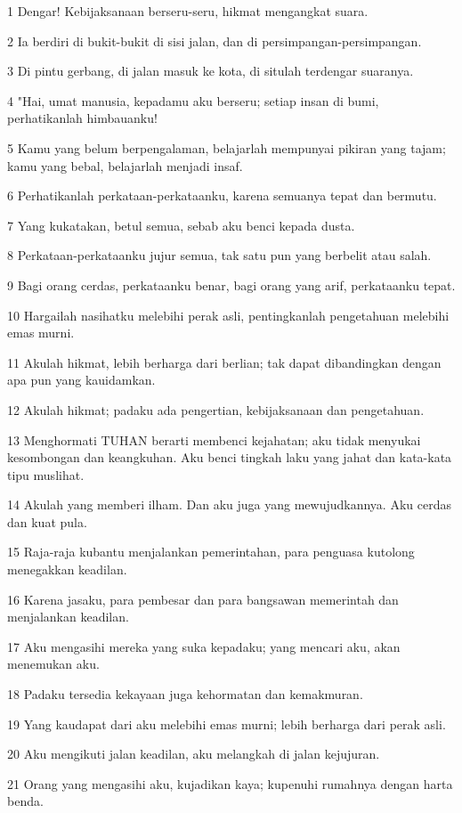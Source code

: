 \par 1 Dengar! Kebijaksanaan berseru-seru, hikmat mengangkat suara.
\par 2 Ia berdiri di bukit-bukit di sisi jalan, dan di persimpangan-persimpangan.
\par 3 Di pintu gerbang, di jalan masuk ke kota, di situlah terdengar suaranya.
\par 4 "Hai, umat manusia, kepadamu aku berseru; setiap insan di bumi, perhatikanlah himbauanku!
\par 5 Kamu yang belum berpengalaman, belajarlah mempunyai pikiran yang tajam; kamu yang bebal, belajarlah menjadi insaf.
\par 6 Perhatikanlah perkataan-perkataanku, karena semuanya tepat dan bermutu.
\par 7 Yang kukatakan, betul semua, sebab aku benci kepada dusta.
\par 8 Perkataan-perkataanku jujur semua, tak satu pun yang berbelit atau salah.
\par 9 Bagi orang cerdas, perkataanku benar, bagi orang yang arif, perkataanku tepat.
\par 10 Hargailah nasihatku melebihi perak asli, pentingkanlah pengetahuan melebihi emas murni.
\par 11 Akulah hikmat, lebih berharga dari berlian; tak dapat dibandingkan dengan apa pun yang kauidamkan.
\par 12 Akulah hikmat; padaku ada pengertian, kebijaksanaan dan pengetahuan.
\par 13 Menghormati TUHAN berarti membenci kejahatan; aku tidak menyukai kesombongan dan keangkuhan. Aku benci tingkah laku yang jahat dan kata-kata tipu muslihat.
\par 14 Akulah yang memberi ilham. Dan aku juga yang mewujudkannya. Aku cerdas dan kuat pula.
\par 15 Raja-raja kubantu menjalankan pemerintahan, para penguasa kutolong menegakkan keadilan.
\par 16 Karena jasaku, para pembesar dan para bangsawan memerintah dan menjalankan keadilan.
\par 17 Aku mengasihi mereka yang suka kepadaku; yang mencari aku, akan menemukan aku.
\par 18 Padaku tersedia kekayaan juga kehormatan dan kemakmuran.
\par 19 Yang kaudapat dari aku melebihi emas murni; lebih berharga dari perak asli.
\par 20 Aku mengikuti jalan keadilan, aku melangkah di jalan kejujuran.
\par 21 Orang yang mengasihi aku, kujadikan kaya; kupenuhi rumahnya dengan harta benda.
